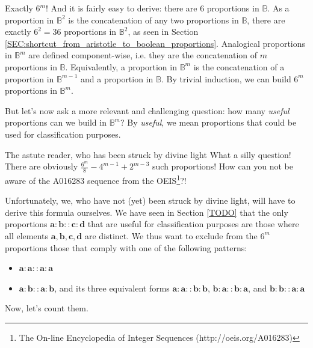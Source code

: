 Exactly $6^m$! And it is fairly easy to derive: there are $6$ proportions in
$\mathbb{B}$. As a proportion in $\mathbb{B}^2$ is the concatenation of any two
proportions in $\mathbb{B}$, there are exactly $6^2 = 36$ proportions in
$\mathbb{B}^2$, as seen in Section
\ref{SEC:shortcut_from_aristotle_to_boolean_proportions}. Analogical
proportions in $\mathbb{B}^m$ are defined component-wise, i.e. they are the
concatenation of $m$ proportions in $\mathbb{B}$. Equivalently, a proportion in
$\mathbb{B}^m$ is the concatenation of a proportion in $\mathbb{B}^{m - 1}$ and
a proportion in $\mathbb{B}$. By trivial induction, we can build $6^m$
proportions in $\mathbb{B}^m$.

But let's now ask a more relevant and challenging question: how many
\textit{useful} proportions can we build in $\mathbb{B}^m$? By \textit{useful},
we mean proportions that could be used for classification purposes.

\begin{aquote}{The astute reader, who has been struck by divine light}
  What a silly question! There are obviously $\frac{6^m}{8} - 4^{m - 1} + 2^{m
  - 3}$ such proportions! How can you not be aware of the A016283 sequence from
  the OEIS\footnote{The On-line Encyclopedia of Integer Sequences
  (http://oeis.org/A016283)}?!
\end{aquote}

Unfortunately, we, who have not (yet) been struck by divine light, will have to
derive this formula ourselves. We have seen in Section \ref{TODO} that the only
proportions $\mathbf{a} : \mathbf{b} :: \mathbf{c} : \mathbf{d}$ that are
useful for classification purposes are those where all elements $\mathbf{a},
\mathbf{b}, \mathbf{c}, \mathbf{d}$ are distinct. We thus want to exclude from
the $6^m$ proportions those that comply with one of the following patterns:

\begin{itemize}
  \item $\mathbf{a}: \mathbf{a} :: \mathbf{a} : \mathbf{a}$
  \item $\mathbf{a}: \mathbf{b} :: \mathbf{a} : \mathbf{b}$, and its three
    equivalent forms $\mathbf{a}: \mathbf{a} :: \mathbf{b} : \mathbf{b}$,
    $\mathbf{b}: \mathbf{a} :: \mathbf{b} : \mathbf{a}$, and $\mathbf{b}:
    \mathbf{b} :: \mathbf{a} : \mathbf{a}$
\end{itemize}

Now, let's count them.

